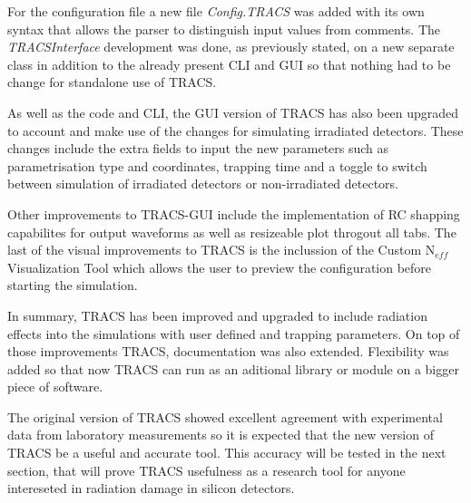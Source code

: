 For the configuration file a new file \textit{Config.TRACS} was added with its own syntax that allows the parser to distinguish input values from comments. The \textit{TRACSInterface} development was done, as previously stated, on a new separate class in addition to the already present CLI and GUI so that nothing had to be change for standalone use of TRACS.

As well as the code and CLI, the GUI version of TRACS has also been upgraded to account and make use of the changes for simulating irradiated detectors. These changes include the extra fields to input the new parameters such as \neff parametrisation type and coordinates, trapping time and a toggle to switch between simulation of irradiated detectors or non-irradiated detectors. 

Other improvements to TRACS-GUI include the implementation of RC shapping capabilites for output waveforms as well as resizeable plot throgout all tabs. The last of the visual improvements to TRACS is the inclussion of the Custom N$_{eff}$ Visualization Tool which allows the user to preview the \neff configuration before starting the simulation.

In summary, TRACS has been improved and upgraded to include radiation effects into the simulations with user defined \neff and trapping parameters. On top of those improvements TRACS, documentation was also extended. Flexibility was added so that now TRACS can run as an aditional library or module on a bigger piece of software.

The original version of TRACS showed excellent agreement with experimental data from laboratory measurements so it is expected that the new version of TRACS be a useful and accurate tool. This accuracy will be tested in the next section, that will prove TRACS usefulness as a research tool for anyone intereseted in radiation damage in silicon detectors.

